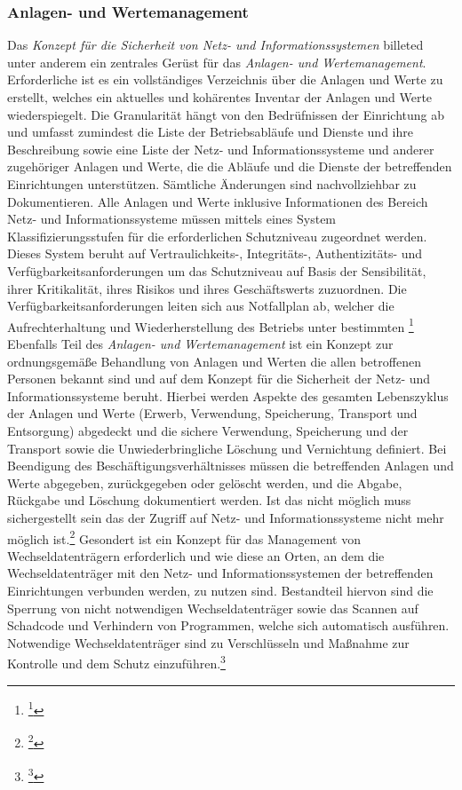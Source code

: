 \documentclass[11pt,a4paper,hidelinks]{article}   %
\begin{document}
            \subsubsection{Anlagen- und Wertemanagement}
            Das \emph{Konzept für die Sicherheit von Netz- und Informationssystemen} billeted unter anderem ein zentrales Gerüst für das \emph{Anlagen- und Wertemanagement}. Erforderliche ist es ein vollständiges Verzeichnis über die Anlagen und Werte zu erstellt, welches ein aktuelles und kohärentes Inventar der Anlagen und Werte wiederspiegelt. Die Granularität hängt von den Bedrüfnissen der Einrichtung ab und umfasst zumindest die Liste der Betriebsabläufe und Dienste und ihre Beschreibung sowie eine Liste der Netz- und Informationssysteme und anderer zugehöriger Anlagen und Werte, die die Abläufe und die Dienste der betreffenden Einrichtungen unterstützen. Sämtliche Änderungen sind nachvollziehbar zu Dokumentieren. Alle Anlagen und Werte inklusive Informationen des Bereich Netz- und Informationssysteme müssen mittels eines System Klassifizierungsstufen für die erforderlichen Schutzniveau zugeordnet werden. Dieses System beruht auf Vertraulichkeits-, Integritäts-, Authentizitäts- und Verfügbarkeitsanforderungen um das Schutzniveau auf Basis der Sensibilität, ihrer Kritikalität, ihres Risikos und ihres Geschäftswerts zuzuordnen. Die Verfügbarkeitsanforderungen leiten sich aus Notfallplan ab, welcher die Aufrechterhaltung und Wiederherstellung des Betriebs unter bestimmten \footnote{\footcite[Vgl.][, Anhang, Nummer 12.1.1., 12.1.2., 12.4.1., 12.4.2. \& 12.4.3.]{EU2024-2690}} Ebenfalls Teil des \emph{Anlagen- und Wertemanagement} ist ein Konzept zur ordnungsgemäße Behandlung von Anlagen und Werten die allen betroffenen Personen bekannt sind und auf dem Konzept für die Sicherheit der Netz- und Informationssysteme beruht. Hierbei werden Aspekte des gesamten Lebenszyklus der Anlagen und Werte (Erwerb, Verwendung, Speicherung, Transport und Entsorgung) abgedeckt und die sichere Verwendung, Speicherung und der Transport sowie die Unwiederbringliche Löschung und Vernichtung definiert. Bei Beendigung des Beschäftigungsverhältnisses müssen die betreffenden Anlagen und Werte abgegeben, zurückgegeben oder gelöscht werden, und die Abgabe, Rückgabe und Löschung dokumentiert werden. Ist das nicht möglich muss sichergestellt sein das der Zugriff auf Netz- und Informationssysteme nicht mehr möglich ist.\footnote{\footcite[Vgl.][, Anhang, Nummer 12.2.1., 12.2.2., \& 12.4.5.]{EU2024-2690}} Gesondert ist ein Konzept für das Management von Wechseldatenträgern erforderlich und wie diese an Orten, an dem die Wechseldatenträger mit den Netz- und Informationssystemen der betreffenden Einrichtungen verbunden werden, zu nutzen sind. Bestandteil hiervon sind die Sperrung von nicht notwendigen Wechseldatenträger sowie das Scannen auf Schadcode und Verhindern von Programmen, welche sich automatisch ausführen. Notwendige Wechseldatenträger sind zu Verschlüsseln und Maßnahme zur Kontrolle und dem Schutz einzuführen.\footnote{\footcite[Vgl.][, Anhang, Nummer 12.3.1., \& 12.3.2.]{EU2024-2690}}
\end{document}
